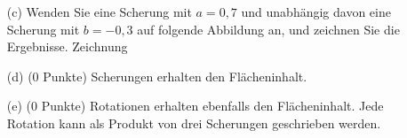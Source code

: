 \documentclass[11pt]{article}
\begin{document}
\begin{enumerate}
\item[(c)] Wenden Sie eine Scherung mit $a = 0,7$ und unabhängig davon eine Scherung mit
$b = -0,3$ auf folgende Abbildung an, und zeichnen Sie die Ergebnisse.
{\color{red}Zeichnung}

\item[(d) (0 Punkte)] Scherungen erhalten den Flächeninhalt.
\item[(e) (0 Punkte)] Rotationen erhalten ebenfalls den Flächeninhalt. Jede Rotation kann als Produkt von drei Scherungen geschrieben werden.
\end{enumerate}
\end{document}
